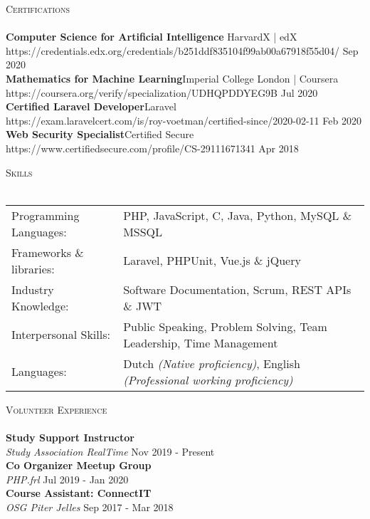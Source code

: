 \documentclass[a4paper]{article}
\newcommand{\lineunder} {
    \vspace*{-8pt} \\
    \hspace*{-18pt} \hrulefill \\
}
\newcommand{\header} [1] {
    {\hspace*{-18pt}\vspace*{6pt} \textsc{#1}}
    \vspace*{-6pt} \lineunder
}
\begin{document}
\newpage

\header{Certifications}
\textbf{Computer Science for Artificial Intelligence }\hfill HarvardX | edX\\
https://credentials.edx.org/credentials/b251ddf835104f99ab00a67918f55d04/ \hfill Sep 2020\\
\vspace{2mm}
\textbf{Mathematics for Machine Learning}\hfill Imperial College London | Coursera\\
https://coursera.org/verify/specialization/UDHQPDDYEG9B \hfill Jul 2020\\
\vspace{2mm}
\textbf{Certified Laravel Developer}\hfill Laravel\\
https://exam.laravelcert.com/is/roy-voetman/certified-since/2020-02-11 \hfill Feb 2020\\
\vspace{2mm}
\textbf{Web Security Specialist}\hfill Certified Secure\\
https://www.certifiedsecure.com/profile/CS-29111671341 \hfill Apr 2018\\
\vspace{2mm}

\vspace{5mm}

\header{Skills}
\vspace{2mm}
\begin{tabular}{l l}
	Programming Languages:   & PHP, JavaScript, C, Java, Python, MySQL \& MSSQL                     \\
    Frameworks \& libraries: & Laravel, PHPUnit, Vue.js \& jQuery                                   \\
	Industry Knowledge:      & Software Documentation, Scrum, REST APIs \& JWT    \\
	Interpersonal Skills:    & Public Speaking, Problem Solving, Team Leadership, Time Management \\
    Languages:               & Dutch \emph{(Native proficiency)}, English \emph{(Professional working proficiency)}\\
\end{tabular}
\vspace{2mm}

\vspace{5mm}

\header{Volunteer Experience}
\vspace{1mm}
\textbf{Study Support Instructor} \hfill\\
\textit{Study Association RealTime} \hfill Nov 2019 - Present\\
\vspace{2mm}
\textbf{Co Organizer Meetup Group} \hfill\\
\textit{PHP.frl} \hfill Jul 2019 - Jan 2020\\
\vspace{2mm}
\textbf{Course Assistant: ConnectIT} \hfill\\
\textit{OSG Piter Jelles} \hfill Sep 2017 - Mar 2018\\
\vspace{2mm}
\end{document}
